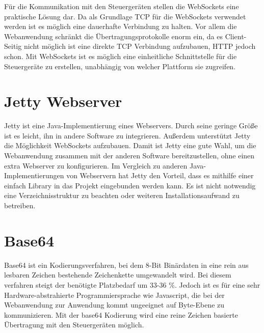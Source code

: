 Für die Kommunikation mit den Steuergeräten stellen die WebSockets eine praktische Lösung dar. Da als Grundlage TCP für die WebSockets verwendet werden ist es möglich eine dauerhafte Verbindung zu halten. Vor allem die Webanwendung schränkt die Übertragungsprotokolle enorm ein, da es Client-Seitig nicht möglich ist eine direkte TCP Verbindung aufzubauen, HTTP jedoch schon. Mit WebSockets ist es möglich eine einheitliche Schnittstelle für die Steuergeräte zu erstellen, unabhängig von welcher Plattform sie zugreifen.



\section{Jetty Webserver}
Jetty \cite{JETTY} ist eine Java-Implementierung eines Webservers. Durch seine geringe Größe ist es leicht, ihn in andere Software zu integrieren. Außerdem unterstützt Jetty die Möglichkeit WebSockets aufzubauen. Damit ist Jetty eine gute Wahl, um die Webanwendung zusammen mit der anderen Software bereitzustellen, ohne einen extra Webserver zu konfigurieren. Im Vergleich zu anderen Java-Implementierungen von Webservern hat Jetty den Vorteil, dass es mithilfe einer einfach Library in das Projekt eingebunden werden kann. Es ist nicht notwendig eine Verzeichnisstruktur zu beachten oder weiteren Installationsaufwand zu betreiben.



\section{Base64}
Base64 ist ein Kodierungsverfahren, bei dem 8-Bit Binärdaten in eine rein aus lesbaren Zeichen bestehende Zeichenkette umgewandelt wird. Bei diesem verfahren steigt der benötigte Platzbedarf um 33-36 \%. Jedoch ist es für eine sehr Hardware-abstrahierte Programmiersprache wie Javascript, die bei der Webanwendung zur Anwendung kommt ungeeignet auf Byte-Ebene zu kommunizieren. Mit der base64 Kodierung wird eine reine Zeichen basierte Übertragung mit den Steuergeräten möglich.